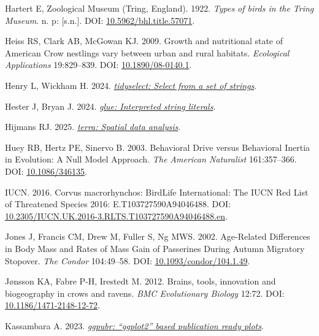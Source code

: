 \documentclass[10pt,a4paper]{article}
\newlength{\cslhangindent}
\newenvironment{CSLReferences}[2] %
 {\begin{list}{}{%
  \setlength{\itemindent}{0pt}
  \setlength{\leftmargin}{0pt}
  \setlength{\parsep}{0pt}
  \ifodd #1
   \setlength{\leftmargin}{\cslhangindent}
   \setlength{\itemindent}{-1\cslhangindent}
  \fi
  \setlength{\itemsep}{#2\baselineskip}}}
 {\end{list}}
\begin{document}
\begin{CSLReferences}{1}{0}
Hartert E, Zoological Museum (Tring, England). 1922. \emph{Types of birds in the {Tring} {Museum}}. n. p: {[}s.n.{]}. DOI: \href{https://doi.org/10.5962/bhl.title.57071}{10.5962/bhl.title.57071}.

Heiss RS, Clark AB, McGowan KJ. 2009. Growth and nutritional state of {American} {Crow} nestlings vary between urban and rural habitats. \emph{Ecological Applications} 19:829--839. DOI: \href{https://doi.org/10.1890/08-0140.1}{10.1890/08-0140.1}.

Henry L, Wickham H. 2024. \emph{\href{https://CRAN.R-project.org/package=tidyselect}{{tidyselect}: Select from a set of strings}}.

Hester J, Bryan J. 2024. \emph{\href{https://CRAN.R-project.org/package=glue}{{glue}: Interpreted string literals}}.

Hijmans RJ. 2025. \emph{\href{https://CRAN.R-project.org/package=terra}{{terra}: Spatial data analysis}}.

Huey RB, Hertz PE, Sinervo B. 2003. Behavioral {Drive} versus {Behavioral} {Inertia} in {Evolution}: {A} {Null} {Model} {Approach}. \emph{The American Naturalist} 161:357--366. DOI: \href{https://doi.org/10.1086/346135}{10.1086/346135}.

IUCN. 2016. Corvus macrorhynchos: {BirdLife} {International}: {The} {IUCN} {Red} {List} of {Threatened} {Species} 2016: E.{T103727590A94046488}. DOI: \href{https://doi.org/10.2305/IUCN.UK.2016-3.RLTS.T103727590A94046488.en}{10.2305/IUCN.UK.2016-3.RLTS.T103727590A94046488.en}.

Jones J, Francis CM, Drew M, Fuller S, Ng MWS. 2002. Age-{Related} {Differences} in {Body} {Mass} and {Rates} of {Mass} {Gain} of {Passerines} {During} {Autumn} {Migratory} {Stopover}. \emph{The Condor} 104:49--58. DOI: \href{https://doi.org/10.1093/condor/104.1.49}{10.1093/condor/104.1.49}.

Jønsson KA, Fabre P-H, Irestedt M. 2012. Brains, tools, innovation and biogeography in crows and ravens. \emph{BMC Evolutionary Biology} 12:72. DOI: \href{https://doi.org/10.1186/1471-2148-12-72}{10.1186/1471-2148-12-72}.

Kassambara A. 2023. \emph{\href{https://CRAN.R-project.org/package=ggpubr}{{ggpubr}: {``{ggplot2}''} based publication ready plots}}.


\end{CSLReferences}
\end{document}
